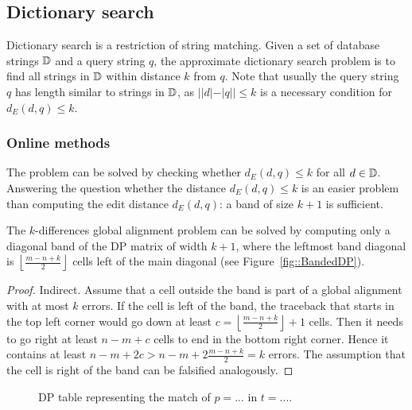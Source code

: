 
\subsection{Dictionary search}

Dictionary search is a restriction of string matching.
Given a set of database strings $\mathbb {D}$ and a query string $q$, the approximate dictionary search problem is to find all strings in $\mathbb {D}$ within distance $k$ from $q$.
Note that usually the query string $q$ has length similar to strings in $\mathbb {D}$, as $| |d| - |q| | \leq k$ is a necessary condition for $d_E(d,q) \leq k$.

\subsubsection{Online methods}

The problem can be solved by checking whether $d_E(d,q) \leq k$ for all $d \in \mathbb {D}$.
Answering the question whether the distance $d_E(d,q) \leq k$ is an easier problem than computing the edit distance $d_E(d,q)$: a band of size $k+1$ is sufficient.

\begin{lemma}
\label{lemma:kband}
The $k$-differences global alignment problem can be solved by computing only a diagonal band of the DP matrix of width $k+1$, where the leftmost band diagonal is $\left\lfloor\frac{m-n+k}{2}\right\rfloor$ cells left of the main diagonal (see Figure~\ref{fig::BandedDP}).
\end{lemma}
\begin{proof}
Indirect. Assume that a cell outside the band is part of a global alignment with at most $k$ errors.
If the cell is left of the band, the traceback that starts in the top left corner would go down at least $c=\left\lfloor\frac{m-n+k}{2}\right\rfloor+1$ cells. Then it needs to go right at least $n-m+c$ cells to end in the bottom right corner.
Hence it contains at least $n-m+2c>n-m+2\frac{m-n+k}{2}=k$ errors.
The assumption that the cell is right of the band can be falsified analogously.
\end{proof}

\begin{figure}[h]
\begin{center}
\caption[Example of $k$-differences global aligment via DP.]{DP table representing the match of $p=...$ in $t=...$.}
\label{fig:dict-dp}

\end{center}
\end{figure}

